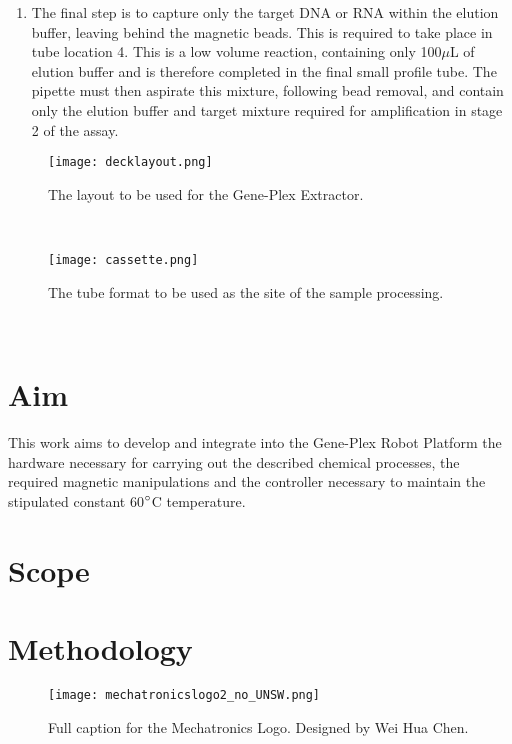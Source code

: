 \begin{enumerate}
	\item The final step is to capture only the target DNA or RNA within the elution buffer, leaving behind the magnetic beads. This is required to take place in tube location 4. This is a low volume reaction, containing only 100$\mu$L of elution buffer and is therefore completed in the final small profile tube. The pipette must then aspirate this mixture, following bead removal, and contain only the elution buffer and target mixture required for amplification in stage 2 of the assay.
\end{enumerate}

\begin{figure}
	\centering
	\texttt{[image: decklayout.png]}
	\caption[Extractor deck layout.]{The layout to be used for the Gene-Plex Extractor.}
	\label{fig:decklayout}
\end{figure} 

\begin{figure}
	\centering
	\texttt{[image: cassette.png]}
	\caption[Extraction cassette tubes.]{The tube format to be used as the site of the sample processing.}
	\label{fig:cassette}
\end{figure} 


\section{Aim}
\label{sec:intro_aim}
This work aims to develop and integrate into the Gene-Plex Robot Platform the hardware necessary for carrying out the described chemical processes, the required magnetic manipulations and the controller necessary to maintain the stipulated constant 60$\degree$C temperature.\\

\section{Scope}
\label{sec:intro_scope}


\section{Methodology}
\label{sec:intro_method}




\begin{figure}
\centering
\texttt{[image: mechatronicslogo2\_no\_UNSW.png]}
\caption[Short caption for list of figures.]{Full caption for the Mechatronics Logo. Designed by Wei Hua Chen.}
\label{fig:intro_logo}
\end{figure}

